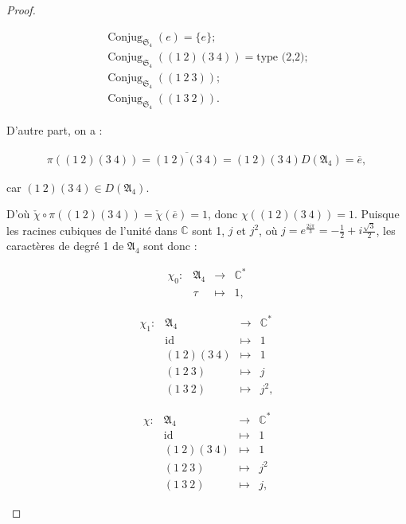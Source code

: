 \documentclass[french]{book}
\theoremstyle{definition}
\theoremstyle{remark}
\begin{document}
\begin{proof}
\begin{enumerate}
\begin{enumerate}
      \begin{gather*}
        \operatorname{Conjug}_{\mathfrak{S}_{4}}(e) = \{ e \} ; \\
        \operatorname{Conjug}_{\mathfrak{S}_{4}}((1 \ 2)(3 \ 4)) = \text{type (2,2)} ; \\
        \operatorname{Conjug}_{\mathfrak{S}_{4}}((1 \ 2 \ 3)) ; \\
        \operatorname{Conjug}_{\mathfrak{S}_{4}}((1 \ 3 \ 2)).
      \end{gather*}

      D'autre part, on a :

      \begin{gather*}
        \pi((1 \ 2)(3 \ 4)) = \overline{(1 \ 2)(3 \ 4)} = (1 \ 2)(3 \ 4)D(\mathfrak{A}_{4}) = \overline{e},
      \end{gather*}

      car \((1 \ 2)(3 \ 4) \in D(\mathfrak{A}_{4})\).

      D'où \(\check{\chi} \circ \pi((1 \ 2)(3 \ 4)) = \check{\chi}(\overline{e}) = 1\), donc \(\chi((1 \ 2)(3 \ 4)) = 1\).
      Puisque les racines cubiques de l'unité dans \(\mathbb{C}\) sont 1, \(j\) et \(j^2\), où \(j = e^{\frac{2 i \pi}{3}} = - \frac{1}{2} + i \frac{\sqrt{3}}{2}\), les caractères de degré 1 de \(\mathfrak{A}_{4}\) sont donc :

      \[\begin{matrix}
      \chi_0 : & \mathfrak{A}_{4} & \longrightarrow & \mathbb{C}^{*} \\
      \ & \tau & \longmapsto & 1,
      \end{matrix}\]

      \[\begin{matrix}
      \chi_1 : & \mathfrak{A}_{4} & \longrightarrow & \mathbb{C}^{*} \\
      \ & \operatorname{id} & \longmapsto & 1 \\
      \ & (1 \ 2)(3 \ 4) & \longmapsto & 1 \\
      \ & (1 \ 2 \ 3) & \longmapsto & j \\
      \ & (1 \ 3 \ 2) & \longmapsto & j^2,
      \end{matrix}\]

      \[\begin{matrix}
      \chi : & \mathfrak{A}_{4} & \longrightarrow & \mathbb{C}^{*} \\
      \ & \operatorname{id} & \longmapsto & 1 \\
      \ & (1 \ 2)(3 \ 4) & \longmapsto & 1 \\
      \ & (1 \ 2 \ 3) & \longmapsto & j ^2 \\
      \ & (1 \ 3 \ 2) & \longmapsto & j,
      \end{matrix}\]


\end{enumerate}
\end{enumerate}
\end{proof}
\end{document}
